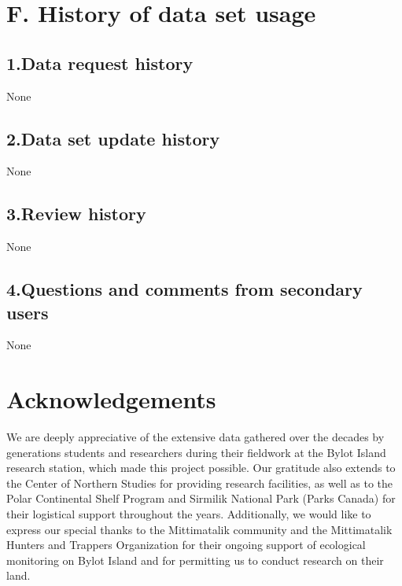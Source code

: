 \documentclass[a4paper,twoside,12pt]{article}
\begin{document}
   \section*{F. History of data set usage}
       \subsection*{1.Data request history} None
       \subsection*{2.Data set update history} None
       \subsection*{3.Review history}  None
       \subsection*{4.Questions and comments from secondary users} None
   
   \section*{Acknowledgements}
We are deeply appreciative of the extensive data gathered over the decades by generations students and researchers during their fieldwork at the Bylot Island research station, which made this project possible. Our gratitude also extends to the Center of Northern Studies for providing research facilities, as well as to the Polar Continental Shelf Program and Sirmilik National Park (Parks Canada) for their logistical support throughout the years. Additionally, we would like to express our special thanks to the Mittimatalik community and the Mittimatalik Hunters and Trappers Organization for their ongoing support of ecological monitoring on Bylot Island and for permitting us to conduct research on their land.
   
\clearpage

\end{document}
